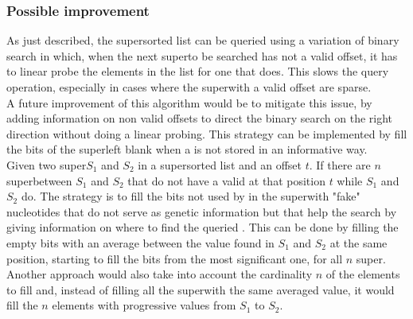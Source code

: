 \subsubsection{Possible improvement}
As just described, the super\kmer sorted list can be queried using a variation of binary search in which, when the next super\kmer to be searched has not a valid offset, it has to linear probe the elements in the list for one that does. This slows the query operation, especially in cases where the super\kmers with a valid offset are sparse. \\
A future improvement of this algorithm would be to mitigate this issue, by adding information on non valid offsets to direct the binary search on the right direction without doing a linear probing. This strategy can be implemented by fill the bits of the super\kmer left blank when a \kmer is not stored in an informative way.\\
Given two super\kmers $S_1$ and $S_2$ in a super\kmer sorted list and an offset $t$. If there are $n$ super\kmers between $S_1$ and $S_2$ that do not have a valid \kmer at that position $t$ while $S_1$ and $S_2$ do. The strategy is to fill the bits not used by \kmers in the super\kmer with "fake" nucleotides that do not serve as genetic information but that help the search by giving information on where to find the queried \kmer. This can be done by filling the empty bits with an average between the value found in $S_1$ and $S_2$ at the same position, starting to fill the bits from the most significant one, for all $n$ super\kmers. Another approach would also take into account the cardinality $n$ of the elements to fill and, instead of filling all the super\kmers with the same averaged value, it would fill the $n$ elements with progressive values from $S_1$ to $S_2$.


